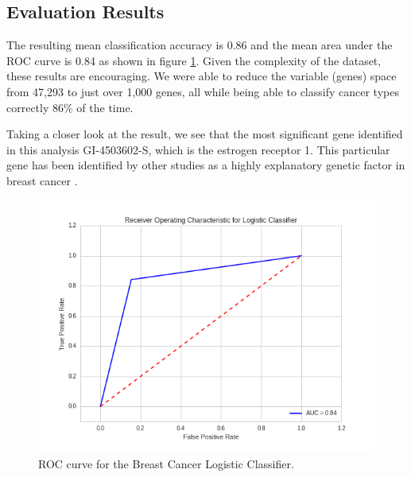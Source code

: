 \documentclass[12pt,a4paper]{article}
\begin{document}
\subsection{Evaluation Results}
The resulting mean classification accuracy is 0.86 and the mean area under the ROC curve is 0.84 as shown in figure \ref{fig:3}. Given the complexity of the dataset, these results are encouraging. We were able to reduce the variable (genes) space from 47,293 to just over 1,000 genes, all while being able to classify cancer types correctly 86\% of the time.\\
\par Taking a closer look at the result, we see that the most significant gene identified in this analysis GI-4503602-S, which is the estrogen receptor 1. This particular gene has been identified by other studies as a highly explanatory genetic factor in breast cancer \cite{Glaab2012}. 
\begin{figure}[ht!]
\begin{center}
\includegraphics[scale=.625]{roc.png}
\caption{ROC curve for the Breast Cancer Logistic Classifier.}
\label{fig:3}
\end{center}
\end{figure}
\end{document}

